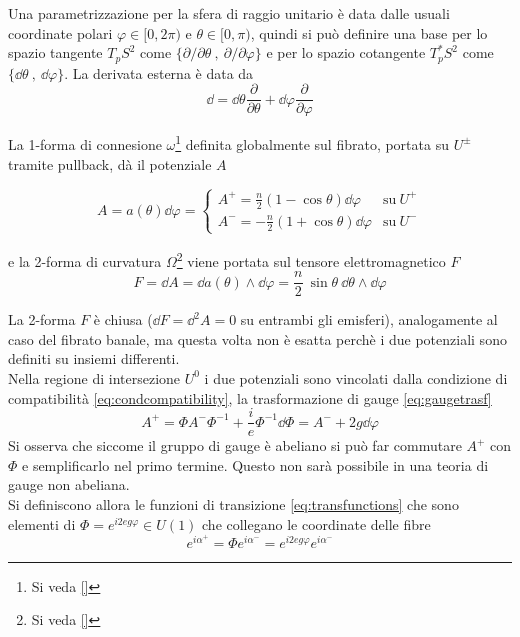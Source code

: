 Una parametrizzazione per la sfera di raggio unitario è data dalle usuali
coordinate polari $\varphi  \in[0,2\pi)$ e $\theta \in [0,\pi)$,
quindi si può definire una base per lo spazio tangente $T_pS^2$ come
$\{ \partial / \partial \theta \: , \: \partial / \partial \varphi  \}$
e per lo spazio cotangente $T^*_pS^2$ come $\{ \dd \theta \: , \: \dd \varphi  \}$.
La derivata esterna è data da
$$
   \dd  = \dd \theta \frac{\partial}{\partial \theta}
        + \dd \varphi    \frac{\partial}{\partial \varphi  }
$$

La 1-forma di connesione $\omega$\footnote{Si veda \ref{}}
definita globalmente sul fibrato, portata su $U^\pm$ tramite pullback,
dà il potenziale $A$

\begin{equation}\label{eq:hopfpotential}
   A = a(\theta)\dd \varphi =  \begin{cases}
      A^+ =  \frac{n}{2}(1 - \cos\theta ) \dd \varphi  & \mathrm{su \:} U^+ \\
      A^- = -\frac{n}{2}(1 + \cos\theta ) \dd \varphi  & \mathrm{su \:} U^-
   \end{cases}
\end{equation}

e la 2-forma di curvatura $\Omega$\footnote{Si veda \ref{}} viene portata
sul tensore elettromagnetico $F$
$$
   F = \dd A = \dd a(\theta)\wedge \dd \varphi= \frac{n}{2} \: \sin\theta \: \dd \theta \wedge \dd \varphi
$$

La 2-forma $F$ è chiusa ($\dd F = \dd ^2A = 0$ su entrambi gli emisferi),
analogamente al caso del fibrato banale, ma questa volta non è esatta perchè i due potenziali
sono definiti su insiemi differenti.\\

Nella regione di intersezione $U^0$ i due potenziali sono vincolati dalla condizione
di compatibilità \ref{eq:condcompatibility}, la trasformazione di gauge \ref{eq:gaugetrasf}
$$
   A^+ = \Phi A^- \Phi ^{-1} + \frac{i}{e}\Phi ^{-1} \dd \Phi
       = A^- + 2g \dd  \varphi
$$
Si osserva che siccome il gruppo di gauge è abeliano si può far commutare $A^+$
con $\Phi$ e semplificarlo nel primo termine. Questo non sarà possibile in una
teoria di gauge non abeliana. \\
Si definiscono allora le funzioni di transizione \ref{eq:transfunctions}
che sono elementi di $\Phi = e^{i 2eg \varphi} \in U(1)$ che collegano le coordinate delle fibre
$$
    e^{i\alpha^+} = \Phi  e^{i\alpha^-} = e^{i2eg\varphi } e^{i\alpha^-}
$$

